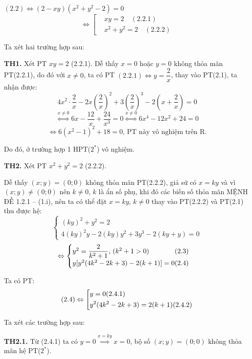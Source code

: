 \documentclass[12pt]{report}
\begin{document}
\vspace{0.2cm}
\noindent $(2.2) \Leftrightarrow (2 - xy)(x^2 + y^2 - 2) = 0$
\[
\Leftrightarrow \left[ 
\begin{aligned}
&xy = 2 \quad (2.2.1) \\
&x^2 + y^2 = 2 \quad (2.2.2)
\end{aligned} 
\right.
\]

\vspace{0.2cm}
\noindent Ta xét hai trường hợp sau:

\noindent \textbf{TH1.} Xét PT $xy = 2$ (2.2.1). Dễ thấy $x = 0$ hoặc $y = 0$ không thỏa mãn PT(2.2.1), do đó với $x \neq 0$, ta có PT $(2.2.1) \Leftrightarrow y = \dfrac{2}{x}$, thay vào PT(2.1), ta nhận được:
\[
4x^2 \cdot \dfrac{2}{x} - 2x \left(\dfrac{2}{x}\right)^2 + 3\left(\dfrac{2}{x}\right)^3 - 2\left(x + \dfrac{2}{x}\right) = 0
\]
\[
\overset{x \neq 0}{\Leftrightarrow} 6x - \dfrac{12}{x} + \dfrac{24}{x^3} = 0 \overset{x \neq 0}{\Leftrightarrow} 6x^4 - 12x^2 + 24 = 0
\]
\[
\Leftrightarrow 6(x^2 - 1)^2 + 18 = 0\text{, PT này vô nghiệm trên R.}
\]

\noindent Do đó, ở trường hợp 1 HPT($2^*$) vô nghiệm.

\noindent \textbf{TH2.} Xét PT $x^2 + y^2 = 2$ (2.2.2).

\noindent Dễ thấy $(x; y) = (0; 0)$ không thỏa mãn PT(2.2.2), giả sử có $x = ky$ và vì $(x; y) \neq (0; 0)$ nên $k \neq 0$, $k$ là ẩn số phụ, khi đó các biến số thỏa mãn MỆNH ĐỀ 1.2.1 -- (1.i), nên ta có thể đặt $x = ky$, $k \neq 0$ thay vào PT(2.2.2) và PT(2.1) thu được hệ:
\[
\begin{cases}
(ky)^2 + y^2 = 2 \\
4(ky)^2y - 2(ky)y^2 + 3y^3 - 2(ky + y) = 0
\end{cases}
\]
\[
\Leftrightarrow \begin{cases}
y^2 = \dfrac{2}{k^2 + 1}\text{, } (k^2 + 1 > 0) \hfill (2.3) \\
y[y^2(4k^2 - 2k + 3) - 2(k + 1)] = 0 \hfill (2.4)
\end{cases}
\]

\noindent Ta có PT:
\[
(2.4) \Leftrightarrow \left[ 
\begin{aligned}
&y = 0 \hfill (2.4.1) \\
&y^2(4k^2 - 2k + 3) = 2(k + 1) \hfill (2.4.2)
\end{aligned} 
\right.
\]

\noindent Ta xét các trường hợp sau:

\noindent \textbf{TH2.1.} Từ (2.4.1) ta có $y = 0 \overset{x=ky}{\implies} x = 0$, bộ số $(x; y) = (0; 0)$ không thỏa mãn hệ PT($2^*$).
\end{document}

